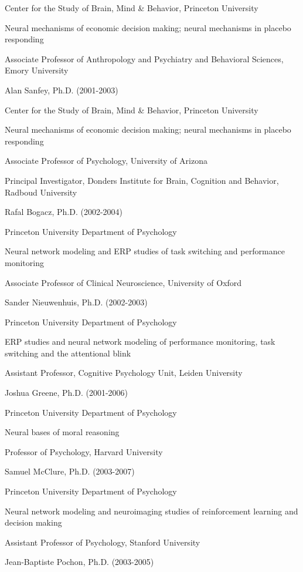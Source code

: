 \documentclass[10 pt]{article}
\begin{document}
Center for the Study of Brain, Mind \& Behavior, Princeton University

Neural mechanisms of economic decision making; neural mechanisms in placebo responding

Associate Professor of Anthropology and Psychiatry and Behavioral Sciences, Emory University
    \medskip

Alan Sanfey, Ph.D. (2001-2003)

Center for the Study of Brain, Mind \& Behavior, Princeton University

Neural mechanisms of economic decision making; neural mechanisms in placebo responding

Associate Professor of Psychology, University of Arizona

Principal Investigator, Donders Institute for Brain, Cognition and Behavior, Radboud University
    \medskip

Rafal Bogacz, Ph.D. (2002-2004)

Princeton University Department of Psychology

Neural network modeling and ERP studies of task switching and performance monitoring

Associate Professor of Clinical Neuroscience, University of Oxford
    \medskip

Sander Nieuwenhuis, Ph.D. (2002-2003)

Princeton University Department of Psychology

ERP studies and neural network modeling of performance monitoring, task switching and the attentional blink

Assistant Professor, Cognitive Psychology Unit, Leiden University
    \medskip

Joshua Greene, Ph.D. (2001-2006)

Princeton University Department of Psychology

Neural bases of moral reasoning

Professor of Psychology, Harvard University
    \medskip

Samuel McClure, Ph.D. (2003-2007)

Princeton University Department of Psychology

Neural network modeling and neuroimaging studies of reinforcement learning and decision making

Assistant Professor of Psychology, Stanford University
    \medskip

Jean-Baptiste Pochon, Ph.D. (2003-2005)
\end{document}
